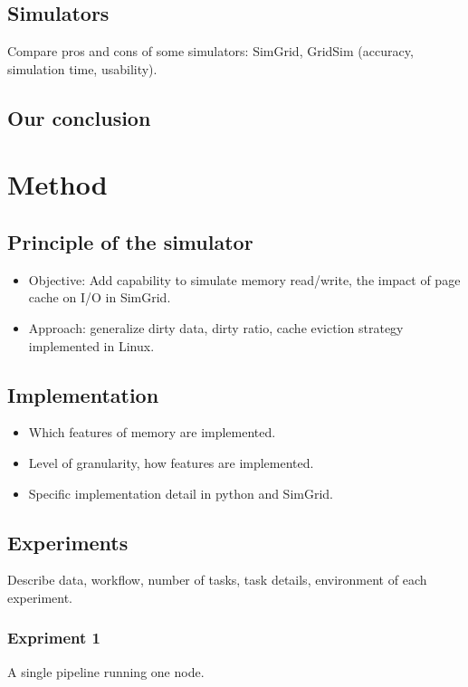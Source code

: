 \documentclass[11pt, a4paper]{article}
\begin{document}
		\subsection{Simulators}
		Compare pros and cons of some simulators: SimGrid, GridSim (accuracy, simulation time, usability).

		\subsection{Our conclusion}

	\section{Method}

		\subsection{Principle of the simulator}

			\begin{itemize}
				\item Objective: Add capability to simulate memory read/write, the impact of page cache on I/O in SimGrid.
				\item Approach: generalize dirty data, dirty ratio, cache eviction strategy implemented in Linux. 
			\end{itemize}

		\subsection{Implementation}
			\begin{itemize}
				\item Which features of memory are implemented.
				\item Level of granularity, how features are implemented.
				\item Specific implementation detail in python and SimGrid.
			\end{itemize}

		\subsection{Experiments}
			Describe data, workflow, number of tasks, task details, environment of each experiment.
	
			\subsubsection{Expriment 1}
				A single pipeline running one node.
\end{document}
